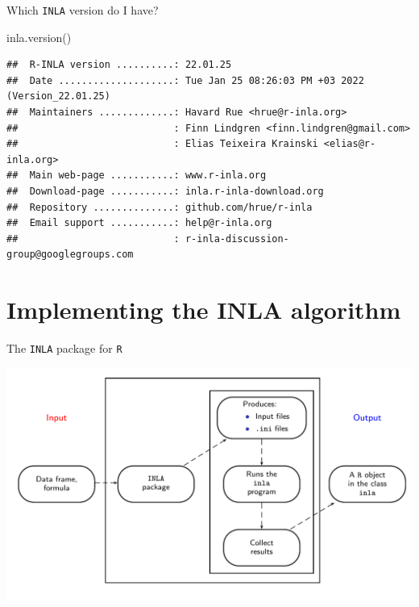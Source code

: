 \documentclass[
  handout]{beamer}
\newenvironment{Shaded}{\begin{snugshade}}{\end{snugshade}}
\newcommand{\FunctionTok}[1]{\textcolor[rgb]{0.00,0.00,0.00}{#1}}
\newcommand{\NormalTok}[1]{#1}
\begin{document}
\begin{frame}[fragile]{Which \texttt{INLA} version do I have?}
\protect\hypertarget{which-inla-version-do-i-have}{}
\begin{Shaded}
\begin{Highlighting}[]
\FunctionTok{inla.version}\NormalTok{()}
\end{Highlighting}
\end{Shaded}

\begin{verbatim}
##  R-INLA version ..........: 22.01.25
##  Date ....................: Tue Jan 25 08:26:03 PM +03 2022 (Version_22.01.25)
##  Maintainers .............: Havard Rue <hrue@r-inla.org>
##                           : Finn Lindgren <finn.lindgren@gmail.com>
##                           : Elias Teixeira Krainski <elias@r-inla.org>
##  Main web-page ...........: www.r-inla.org
##  Download-page ...........: inla.r-inla-download.org
##  Repository ..............: github.com/hrue/r-inla
##  Email support ...........: help@r-inla.org
##                           : r-inla-discussion-group@googlegroups.com
\end{verbatim}
\end{frame}

\hypertarget{implementing-the-inla-algorithm}{%
\section{Implementing the INLA
algorithm}\label{implementing-the-inla-algorithm}}

\begin{frame}{The \texttt{INLA} package for \texttt{R}}
\protect\hypertarget{the-inla-package-for-r}{}
\begin{center}\includegraphics[width=1\linewidth]{graphics/inla-structure} \end{center}
\end{frame}
\end{document}
